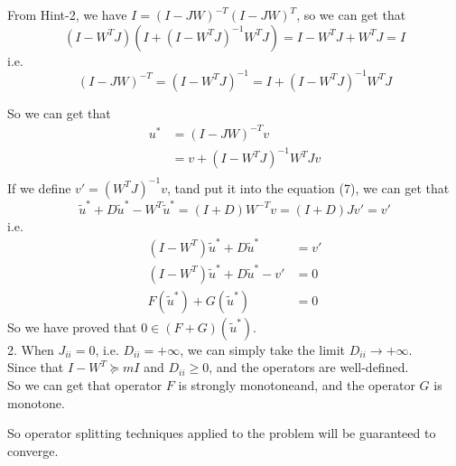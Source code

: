 From Hint-2, we have $I=(I-JW)^{-T}(I-JW)^T$, so we can get that
$$\left(I-W^TJ\right)\left(I+(I-W^TJ)^{-1}W^TJ\right)=I-W^TJ+W^TJ=I$$
i.e.
$$(I-JW)^{-T}=(I-W^TJ)^{-1}=I+(I-W^TJ)^{-1}W^TJ$$

So we can get that
\begin{align*}
u^* &= (I-JW)^{-T}v \\
&= v+(I-W^TJ)^{-1}W^TJv \\
\end{align*}
If we define $v'=(W^TJ)^{-1}v$, tand put it into the equation (7), we can get that
$$\tilde{u}^*+D\tilde{u}^*-W^T\tilde{u}^*=(I+D)W^{-T}v=(I+D)Jv'=v'$$
i.e.
\begin{align*}
(I-W^T)\tilde{u}^*+D\tilde{u}^* &= v' \\
(I-W^T)\tilde{u}^*+D\tilde{u}^* -v' &= 0 \\
F(\tilde{u}^*)+G(\tilde{u}^*) &= 0
\end{align*}
So we have proved that $0\in (F+G)(\tilde{u}^*)$.\\


2. When $J_{ii}=0$, i.e. $D_{ii}=+\infty$, we can simply take the limit $D_{ii}\to +\infty$.\\
Since that $I-W^T\succeq mI$ and $D_{ii}\geq 0$, and the operators are well-defined.\\
So we can get that operator $F$ is strongly monotoneand, and the operator $G$ is monotone.

So operator splitting techniques applied to the problem will be guaranteed to converge.
